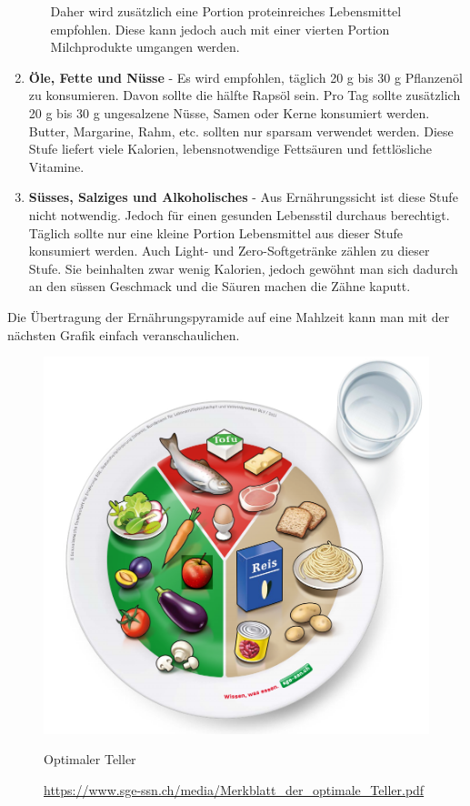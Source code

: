 \begin{enumerate}
\begin{enumerate}
    \newline
    Daher wird zusätzlich eine Portion proteinreiches Lebensmittel empfohlen. Diese kann jedoch auch mit einer vierten Portion Milchprodukte umgangen werden. \cite{stufe_fleisch_fisch_eier_tofu_2}
  \end{enumerate}
  \item \textbf{Öle, Fette und Nüsse} - Es wird empfohlen, täglich 20 g bis 30 g Pflanzenöl zu konsumieren. Davon sollte die hälfte Rapsöl sein. Pro Tag sollte zusätzlich 20 g bis 30 g ungesalzene Nüsse, Samen oder Kerne konsumiert werden.
  \newline
  Butter, Margarine, Rahm, etc. sollten nur sparsam verwendet werden.
  \newline
  Diese Stufe liefert viele Kalorien, lebensnotwendige Fettsäuren und fettlösliche Vitamine. \cite{stufe_le_fette_nuesse}
  \item \textbf{Süsses, Salziges und Alkoholisches} - Aus Ernährungssicht ist diese Stufe nicht notwendig. Jedoch für einen gesunden Lebensstil durchaus berechtigt. 
  Täglich sollte nur eine kleine Portion Lebensmittel aus dieser Stufe konsumiert werden.
  Auch Light- und Zero-Softgetränke zählen zu dieser Stufe. Sie beinhalten zwar wenig Kalorien, jedoch gewöhnt man sich dadurch an den süssen Geschmack und die Säuren machen die Zähne kaputt. \cite{stufe_suesses_salziges_alkoholisches}
\end{enumerate}
Die Übertragung der Ernährungspyramide auf eine Mahlzeit kann man mit der nächsten Grafik einfach veranschaulichen.
\newline
\begin{figure}[!hbpt]
  \centering
  \includegraphics[width=0.5\linewidth]{./images/der_perfekte_teller.png}
  \caption{Optimaler Teller}
  \label{fig:teller}
  \caption*{\url{https://www.sge-ssn.ch/media/Merkblatt_der_optimale_Teller.pdf}}
\end{figure}
